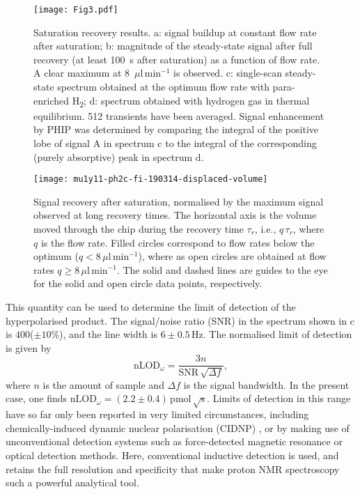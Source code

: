 \begin{figure}[]
	\centering
	\texttt{[image: Fig3.pdf]}
	\caption{Saturation recovery results.
	a: signal buildup at constant
	flow rate after saturation;
	b: magnitude of the steady-state signal after full recovery (at least
	100~s after saturation) as a function of flow rate. A clear maximum
	at 8~$\mu\mathrm{l}\,\text{min}^{-1}$ is observed.
	c: single-scan steady-state spectrum obtained at the optimum flow rate
	with para-enriched H\textsubscript{2}; d: spectrum obtained with hydrogen gas
	in thermal equilibrium. 512 transients have been averaged. Signal enhancement by
	PHIP was determined by comparing the integral of the positive lobe of signal A in
	spectrum c to the
	integral of the corresponding (purely absorptive) peak in spectrum d.
	}
	\label{fig:phip@chip3}
\end{figure}

\begin{figure}
  \begin{center}
  \texttt{[image: mu1y11-ph2c-fi-190314-displaced-volume]}
  \end{center}
  \caption{Signal recovery after saturation, normalised by the maximum signal
  observed at long recovery times. The horizontal axis is the volume
  moved through the chip during the recovery time $\tau_r$, i.e., $q\,\tau_r$,
  where $q$ is the flow rate. Filled circles correspond to flow rates below
  the optimum ($q<8\,\mu\mathrm{l}\,\text{min}^{-1}$), where as open circles
  are obtained at flow rates $q\ge 8\,\mu\mathrm{l}\,\text{min}^{-1}$. The solid
  and dashed lines are guides to the eye for the solid and open circle data points,
  respectively.}
  \label{fig:displaced-volume}
\end{figure}

This quantity can be used to determine the limit of detection of the
hyperpolarised product. The signal/noise ratio (SNR) in the spectrum shown in
c is 400($\pm 10\%$), and the line width is $6\pm
0.5\,\text{Hz}$. The normalised limit of detection is given by \[
\text{nLOD}_\omega = \frac{3 n}{\text{SNR}\,\sqrt{\Delta f}}, \] where $n$ is
the amount of sample and $\Delta f$ is the signal bandwidth. In the present
case, one finds $\text{nLOD}_\omega = (2.2\pm
0.4)\,\text{pmol}\,\sqrt{\text{s}}$. Limits of detection in this range have so
far only been reported in very limited circumstances, including
chemically-induced dynamic nuclear polarisation (CIDNP)
\cite{mompean2018pushing}, or by making use of unconventional detection systems
such as force-detected magnetic resonance or optical detection methods. Here, conventional inductive detection is used, and retains the full
resolution and specificity that make proton NMR spectroscopy such a powerful
analytical tool.

